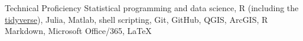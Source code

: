 \documentclass{resume} %
\begin{document}
\begin{rSection}{Technical Proficiency}
{Statistical programming and data science, R (including the \href{https://www.tidyverse.org}{tidyverse}), Julia, Matlab, shell scripting, Git, GitHub, QGIS, ArcGIS, R Markdown,  Microsoft Office/365, \LaTeX}\\
\end{rSection}
\end{document}
